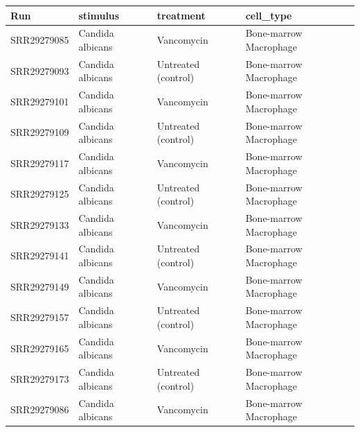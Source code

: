 \documentclass[
  letterpaper,
  DIV=11,
  numbers=noendperiod]{scrreprt}
\newcounter{none} %
\begin{document}
{\def\LTcaptype{none} %
\begin{longtable}[]{@{}
  >{\raggedright\arraybackslash}p{}
  >{\raggedright\arraybackslash}p{}
  >{\raggedright\arraybackslash}p{}
  >{\raggedright\arraybackslash}p{}@{}}
\toprule\noalign{}
\begin{minipage}[b]{\linewidth}\raggedright
Run
\end{minipage} & \begin{minipage}[b]{\linewidth}\raggedright
stimulus
\end{minipage} & \begin{minipage}[b]{\linewidth}\raggedright
treatment
\end{minipage} & \begin{minipage}[b]{\linewidth}\raggedright
cell\_type
\end{minipage} \\
\midrule\noalign{}
\endhead
\bottomrule\noalign{}
\endlastfoot
SRR29279085 & Candida albicans & Vancomycin & Bone-marrow Macrophage \\
SRR29279093 & Candida albicans & Untreated (control) & Bone-marrow
Macrophage \\
SRR29279101 & Candida albicans & Vancomycin & Bone-marrow Macrophage \\
SRR29279109 & Candida albicans & Untreated (control) & Bone-marrow
Macrophage \\
SRR29279117 & Candida albicans & Vancomycin & Bone-marrow Macrophage \\
SRR29279125 & Candida albicans & Untreated (control) & Bone-marrow
Macrophage \\
SRR29279133 & Candida albicans & Vancomycin & Bone-marrow Macrophage \\
SRR29279141 & Candida albicans & Untreated (control) & Bone-marrow
Macrophage \\
SRR29279149 & Candida albicans & Vancomycin & Bone-marrow Macrophage \\
SRR29279157 & Candida albicans & Untreated (control) & Bone-marrow
Macrophage \\
SRR29279165 & Candida albicans & Vancomycin & Bone-marrow Macrophage \\
SRR29279173 & Candida albicans & Untreated (control) & Bone-marrow
Macrophage \\
SRR29279086 & Candida albicans & Vancomycin & Bone-marrow Macrophage \\

\end{longtable}}
\end{document}
